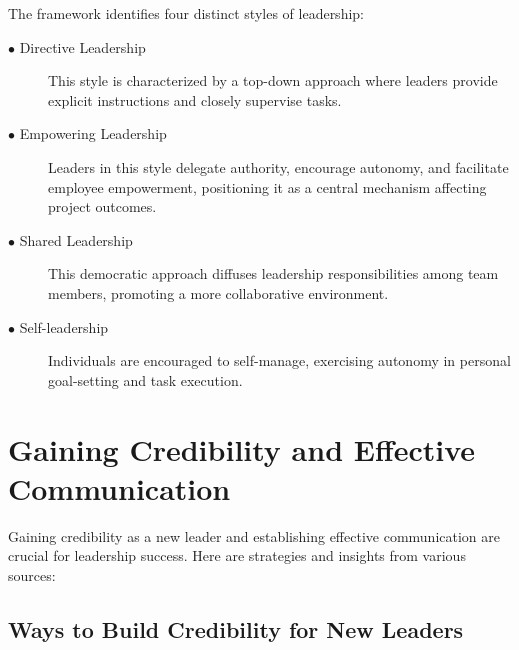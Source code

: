 \documentclass[runningheads]{llncs}
\begin{document}
The framework identifies four distinct styles of leadership: \\
\begin{description}

 \item [$\bullet$ Directive Leadership] This style is characterized by a top-down approach where leaders provide explicit instructions and closely supervise tasks. \\

 \item [$\bullet$ Empowering Leadership] Leaders in this style delegate authority, encourage autonomy, and facilitate employee empowerment, positioning it as a central mechanism affecting project outcomes. \\

 \item [$\bullet$ Shared Leadership] This democratic approach diffuses leadership responsibilities among team members, promoting a more collaborative environment. \\

 \item [$\bullet$ Self-leadership] Individuals are encouraged to self-manage, exercising autonomy in personal goal-setting and task execution. \\

\end{description}

\section{Gaining Credibility and Effective Communication}


Gaining credibility as a new leader and establishing effective communication are crucial for leadership success. Here are strategies and insights from various sources: \cite{ref_2}\cite{ref_3}\cite{ref_5}\cite{ref_8}\cite{ref_11}\cite{ref_17}\cite{ref_22}\cite{ref_24}\cite{ref_25}
\subsection{Ways to Build Credibility for New Leaders}
\end{document}
